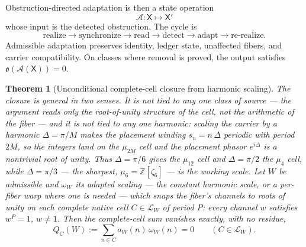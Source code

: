 \documentclass[11pt]{article}
\newtheorem{theorem}{Theorem}
\theoremstyle{definition}
\begin{document}
Obstruction-directed adaptation is then a state operation
\[
\mathcal A:\mathsf X\longmapsto\mathsf X'
\]
whose input is the detected obstruction.  The cycle is
\[
\text{realize}\to
\text{synchronize}\to
\text{read}\to
\text{detect}\to
\text{adapt}\to
\text{re-realize}.
\]
Admissible adaptation preserves identity, ledger state, unaffected fibers, and
carrier compatibility.  On classes where removal is proved, the output
satisfies \(\mathfrak o(\mathcal A(\mathsf X))=0\).

\iffalse
\noindent\textbf{Proof obligations to isolate.}
\begin{enumerate}
\item Define the complete native cell predicate \(C_0\in\mathcal L_W\).
\item Define the focal cell sum
\[
Q_{C_0}(W)=\sum_{n\in C_0}a_W(n)\omega_W(n).
\]
\item Prove exact complete-cell closure:
\[
Q_{C_0}(W)=0.
\]
\item Extend closure coordinatewise to simultaneous carrier states and common
refinements.
\item Define the retained obstruction state \(\mathfrak o(\mathsf X_W)\) in the
carrier-plus-ledger state.
\item Prove the obstruction equivalence
\[
\mathfrak o(\mathsf X_W)=0
\iff
\text{the required carrier condition closes}.
\]
\item Define admissible adaptation \(\mathcal A:\mathsf X\mapsto\mathsf X'\)
and prove preservation of identity, ledger state, unaffected fibers, and
carrier compatibility.
\item For classes with removal, prove
\[
\mathfrak o(\mathcal A(\mathsf X))=0.
\]
\end{enumerate}
\fi

\begin{theorem}[Unconditional complete-cell closure from harmonic scaling]\label{thm:g5-native-cell-closure}
The closure is general in two senses.  It is not tied to any one class of
source --- the argument reads only the root-of-unity structure of the cell, not
the arithmetic of the fiber --- and it is not tied to any one harmonic: scaling
the carrier by a harmonic \(\Delta=\pi/M\) makes the placement winding
\(s_n=n\,\Delta\) periodic with period \(2M\), so the integers land on the
\(\mu_{2M}\) cell and the placement phasor \(e^{i\Delta}\) is a nontrivial root
of unity.  Thus \(\Delta=\pi/6\) gives the \(\mu_{12}\) cell and
\(\Delta=\pi/2\) the \(\mu_4\) cell, while \(\Delta=\pi/3\) --- the sharpest,
\(\mu_6=\mathbb Z[\zeta_6]\) --- is the working scale.  Let \(W\) be admissible
and \(\omega_W\) its adapted scaling --- the constant harmonic scale, or a
per-fiber warp where one is needed --- which snaps the fiber's channels to roots of
unity on each complete native cell \(C\in\mathcal L_W\) of period \(P\): every
channel \(w\) satisfies \(w^P=1\), \(w\neq1\).  Then the complete-cell sum
vanishes exactly, with no residue,
\[
Q_C(W):=\sum_{n\in C}a_W(n)\,\omega_W(n)=0
\qquad(C\in\mathcal L_W).
\]
\end{theorem}
\end{document}
